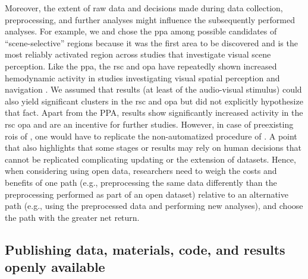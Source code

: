 %
Moreover, the extent of raw data and decisions made during data collection,
preprocessing, and further analyses might influence the subsequently performed
analyses.
%
For example, we and \citet{sengupta2016extension} chose the \ac{ppa} among
possible candidates of ``scene-selective'' regions because it was the first area
to be discovered and is the most reliably activated region across studies that
investigate visual scene perception.
%
Like the \ac{ppa}, the \ac{rsc} and \ac{opa} have repeatedly shown increased
hemodynamic activity in studies investigating visual spatial perception and
navigation \citep{chrastil2018heterogeneity, bettencourt2013role,
dilks2013occipital, epstein2019scene}.
%
We assumed that results (at least of the audio-visual stimulus) could also yield
significant clusters in the \ac{rsc} and \ac{opa} but did not explicitly
hypothesize that fact.
%
Apart from the PPA, results show significantly increased activity in the
\ac{rsc} \ac{opa} and are an incentive for further studies.
However, in case of preexisting \acp{roi} of \citep{sengupta2016extension}, one
would have to replicate the non-automatized procedure of
\citep{sengupta2016extension}.
%
A point that also highlights that some stages or results may rely on human
decisions that cannot be replicated complicating updating or the extension of
datasets.
Hence, when considering using open data, researchers need to weigh the costs and
benefits of one path (e.g., preprocessing the same data differently than the
preprocessing performed as part of an open dataset) relative to an alternative
path (e.g., using the preprocessed data and performing new analyses), and choose
the path with the greater net return.



\subsection{Publishing data, materials, code, and results openly available}


%

